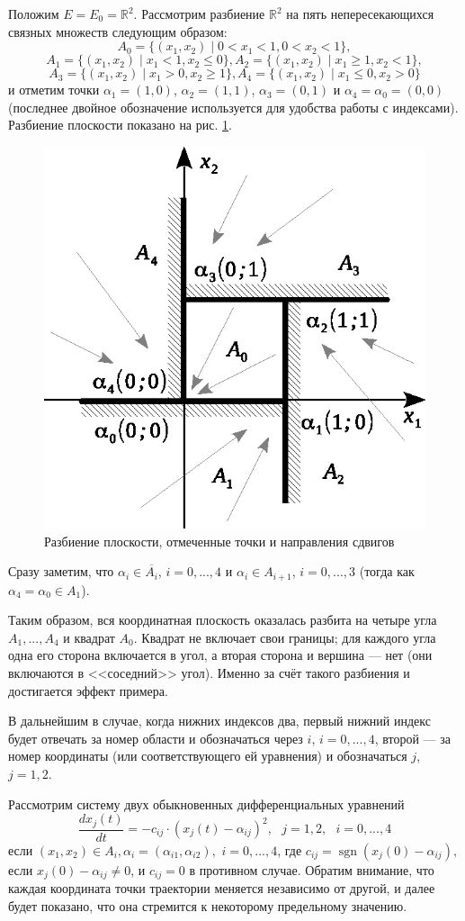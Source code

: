 Положим $E=E_0=\mathbb{R}^2$.
Рассмотрим разбиение  $\mathbb{R}^2$ на пять непересекающихся связных множеств следующим образом:
$$
	A_0 = \{ (x_1, x_2) \mid 0 < x_1 < 1, 0 < x_2 < 1\},
$$
$$
	A_1 = \{ (x_1, x_2) \mid x_1 < 1, x_2 \leq 0  \},
	A_2 = \{ (x_1, x_2) \mid x_1 \geq 1, x_2 < 1  \},
$$
$$
	A_3 = \{ (x_1, x_2) \mid x_1 > 0, x_2 \geq 1  \},
	A_4 = \{ (x_1, x_2) \mid x_1 \leq 0, x_2 > 0  \}
$$
и отметим точки
$\alpha_1=(1, 0)$,
$\alpha_2=(1, 1)$,
$\alpha_3=(0, 1)$ и
$\alpha_4=\alpha_0=(0, 0)$
(последнее двойное обозначение используется для удобства работы с индексами).
Разбиение плоскости показано на рис. \ref{fig:plane-splitted}.

\begin{figure}[h]
	\centering
	\includegraphics[width=0.4\linewidth]{illustr/Zvyagin_Avdeev_attr_2.eps}
	\caption{Разбиение плоскости, отмеченные точки и направления сдвигов}
	\label{fig:plane-splitted}
\end{figure}

Сразу заметим, что $\alpha_i \in \overline{A_i}$, $i=0,...,4$ и
$\alpha_i \in A_{i+1}$, $i=0,...,3$ (тогда как $\alpha_4 = \alpha_0 \in A_{1}$).

Таким образом, вся координатная плоскость оказалась разбита на четыре угла $A_1, ..., A_4$ и квадрат $A_0$.
Квадрат не включает свои границы; для каждого угла одна его сторона включается в угол,
а вторая сторона и вершина --- нет (они включаются в <<соседний>> угол).
Именно за счёт такого разбиения и достигается эффект примера.

В дальнейшим в случае, когда нижних индексов два, первый нижний индекс
будет отвечать за номер области и обозначаться через $i$,
$i=0, ..., 4$, второй --- за номер координаты
(или соответствующего ей уравнения) и обозначаться $j$, $j=1, 2$.

Рассмотрим систему двух обыкновенных дифференциальных уравнений
\begin{equation}\label{difur_primer_R2}
	\frac{dx_j(t)}{dt} = -c_{ij} \cdot (x_j(t)-\alpha_{ij})^2, \mbox{~~} j=1,2, \mbox{~~} i=0,...,4
\end{equation}
если
$
	(x_1, x_2) \in A_i,  \alpha_i = (\alpha_{i1},\alpha_{i2}),
$
$i=0,...,4$,
где
$
	c_{ij} = \operatorname{sgn}(x_j(0)-\alpha_{ij}),
$
если $x_j(0) - \alpha_{ij} \neq 0$,
и $c_{ij} = 0$ в противном случае.
Обратим внимание, что каждая координата точки траектории меняется независимо от другой,
и далее будет показано, что она стремится
к некоторому предельному значению.

